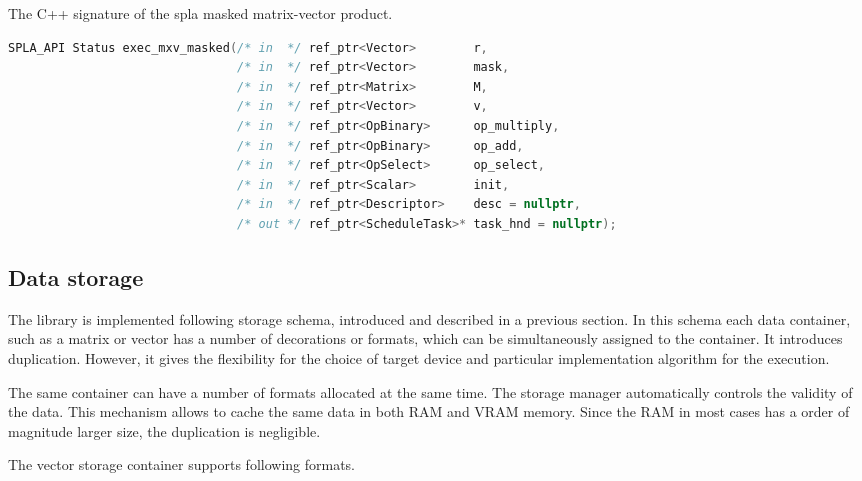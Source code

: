 \begin{algorithm}[tbp]
\caption{The C++ signature of the spla masked matrix-vector product.}
\label{alg:spla_op_example}
\begin{lstlisting}[language=C++]
SPLA_API Status exec_mxv_masked(/* in  */ ref_ptr<Vector>        r,
                                /* in  */ ref_ptr<Vector>        mask,
                                /* in  */ ref_ptr<Matrix>        M,
                                /* in  */ ref_ptr<Vector>        v,
                                /* in  */ ref_ptr<OpBinary>      op_multiply,
                                /* in  */ ref_ptr<OpBinary>      op_add,
                                /* in  */ ref_ptr<OpSelect>      op_select,
                                /* in  */ ref_ptr<Scalar>        init,
                                /* in  */ ref_ptr<Descriptor>    desc = nullptr,
                                /* out */ ref_ptr<ScheduleTask>* task_hnd = nullptr);
\end{lstlisting}
\end{algorithm}

\subsection{Data storage}

The library is implemented following storage schema, introduced and described in a previous section. In this schema each data container, such as a matrix or vector has a number of decorations or formats, which can be simultaneously assigned to the container. It introduces duplication. However, it gives the flexibility for the choice of target device and particular implementation algorithm for the execution.

The same container can have a number of formats allocated at the same time. The storage manager automatically controls the validity of the data. This mechanism allows to cache the same data in both RAM and VRAM memory. Since the RAM in most cases has a order of magnitude larger size, the duplication is negligible.

The vector storage container supports following formats.

